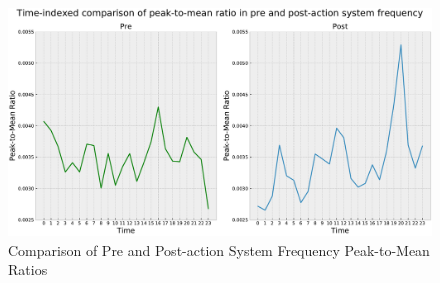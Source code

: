 \documentclass[energies,article,submit,moreauthors,pdftex]{Definitions/mdpi}
\begin{document}
\begin{figure}[H]
\centering
\hspace{-25pt}\includegraphics[width=14 cm]{Graphics/NEW_Freq_PtM_comp.pdf}
\caption{Comparison of Pre and Post-action System Frequency Peak-to-Mean Ratios} \label{fig:freq_PtM}
\end{figure}  







\end{document}
